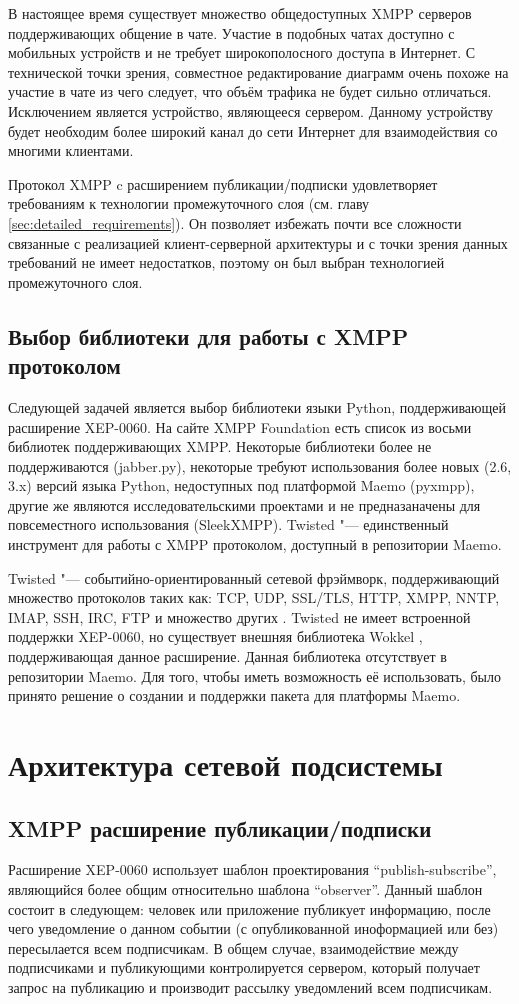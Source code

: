 В настоящее время существует множество общедоступных XMPP серверов
поддерживающих общение в чате. Участие в подобных чатах доступно с мобильных
устройств и не требует широкополосного доступа в Интернет. С технической точки
зрения, совместное редактирование диаграмм очень похоже на участие в чате из
чего следует, что объём трафика не будет сильно отличаться. Исключением является
устройство, являющееся сервером. Данному устройству будет необходим более
широкий канал до сети Интернет для взаимодействия со многими клиентами.

Протокол XMPP c расширением публикации/подписки удовлетворяет требованиям к 
технологии промежуточного слоя (см. главу \ref{sec:detailed_requirements}). 
Он позволяет избежать почти все сложности связанные с реализацией 
клиент-серверной архитектуры и с точки зрения данных требований не имеет 
недостатков, поэтому он был выбран технологией промежуточного слоя.

\subsection{Выбор библиотеки для работы с XMPP протоколом}
Следующей задачей является выбор библиотеки языки Python, поддерживающей
расширение XEP-0060. На сайте XMPP Foundation \cite{xmpp} есть список из
восьми библиотек поддерживающих XMPP. Некоторые библиотеки более не
поддерживаются (jabber.py), некоторые требуют использования более новых (2.6,
3.x) версий языка Python, недоступных под платформой Maemo (pyxmpp), другие же
являются исследовательскими проектами и не предназаначены для повсеместного
использования (SleekXMPP). Twisted "--- единственный инструмент для работы с
XMPP протоколом, доступный в репозитории Maemo.

Twisted "--- событийно-ориентированный сетевой фрэймворк, поддерживающий
множество протоколов таких как: TCP, UDP, SSL/TLS, HTTP, XMPP, NNTP, IMAP, SSH,
IRC, FTP и множество других \cite{twisted}. Twisted не имеет встроенной
поддержки XEP-0060, но существует внешняя библиотека Wokkel \cite{wokkel},
поддерживающая данное расширение. Данная библиотека отсутствует в репозитории
Maemo. Для того, чтобы иметь возможность её использовать, было принято решение о
создании и поддержки пакета для платформы Maemo.

\section{Архитектура сетевой подсистемы}
\subsection{XMPP расширение публикации/подписки}
Расширение XEP-0060 использует шаблон проектирования ``publish-subscribe'',
являющийся более общим относительно шаблона ``observer''. Данный шаблон состоит
в следующем: человек или приложение публикует информацию, после чего уведомление
о данном событии (с опубликованной иноформацией или без) пересылается всем
подписчикам. В общем случае, взаимодействие между подписчиками и публикующими
контролируется сервером, который получает запрос на публикацию и производит
рассылку уведомлений всем подписчикам.

